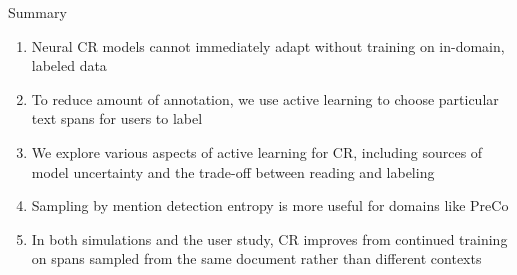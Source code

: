 \begin{frame}{Summary}
\begin{enumerate}
\item Neural CR models cannot immediately adapt without training on in-domain,
labeled data
\item To reduce amount of annotation, we use active learning to choose particular text spans for users to label
\item We explore various aspects of active learning for CR, including sources of
model uncertainty and the trade-off between reading and labeling
\item Sampling by mention detection entropy is more useful for domains like
PreCo
\item In both simulations and the user study,
CR improves from continued training on spans sampled from the same document rather than different
contexts
\end{enumerate}
\end{frame}
